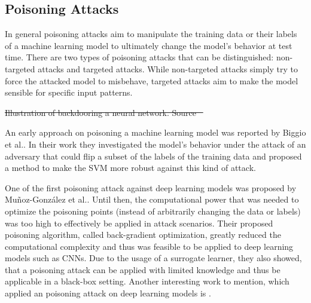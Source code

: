 \documentclass[sigconf]{acmart}
\providecommand{\DIFdel}[1]{{\protect\color{red}\sout{#1}}}                      %
\providecommand{\DIFdelbegin}{} %
\providecommand{\DIFdelend}{} %
\providecommand{\DIFdelFL}[1]{\DIFdel{#1}} %
\begin{document}
\subsection{Poisoning Attacks}
\label{sec:poison}

In general poisoning attacks aim to manipulate the training data or their labels of a machine learning model to ultimately change the model's behavior at test time.
There are two types of poisoning attacks that can be distinguished: non-targeted attacks and targeted attacks.
While non-targeted attacks simply try to force the attacked model to misbehave, targeted attacks aim to make the model sensible for specific input patterns.

\DIFdelbegin %
{%
\DIFdelFL{Illustration of backdooring a neural network. Source \mbox{%
\cite{8685687}}\hspace{0pt}%
}}

\DIFdelend An early approach on poisoning a machine learning model was reported by Biggio et al.\cite{svmPoison}.
In their work they investigated the model's behavior under the attack of an adversary that could flip a subset of the labels of the training data and proposed a method to make the SVM more robust against this kind of attack.

One of the first poisoning attack against deep learning models was proposed by Muñoz-González et al.\cite{DBLP:journals/corr/abs-1708-08689}.
Until then, the computational power that was needed to optimize the poisoning points (instead of arbitrarily changing the data or labels) was too high to effectively be applied in attack scenarios.
Their proposed poisoning algorithm, called back-gradient optimization, greatly reduced the computational complexity and thus was feasible to be applied to deep learning models such as CNNs. 
Due to the usage of a surrogate learner, they also showed, that a poisoning attack can be applied with limited knowledge and thus be applicable in a black-box setting.
Another interesting work to mention, which applied an poisoning attack on deep learning models is \cite{koh2017understanding}.
\end{document}
